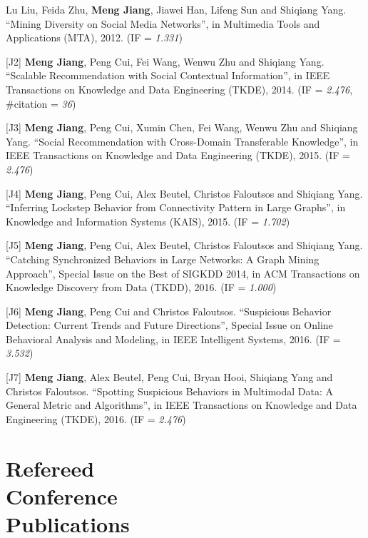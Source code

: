 \documentclass[margin, 10pt]{res}
\begin{document}
\begin{resume}
[J1] Lu Liu, Feida Zhu, \textbf{Meng Jiang}, Jiawei Han, Lifeng Sun and Shiqiang Yang. ``Mining Diversity on Social Media Networks'', in Multimedia Tools and Applications (MTA), 2012. (IF = \textit{1.331})

[J2] \textbf{Meng Jiang}, Peng Cui, Fei Wang, Wenwu Zhu and Shiqiang Yang. ``Scalable Recommendation with Social Contextual Information'', in IEEE Transactions on Knowledge and Data Engineering (TKDE), 2014. (IF = \textit{2.476}, \#citation = \textit{36})

[J3] \textbf{Meng Jiang}, Peng Cui, Xumin Chen, Fei Wang, Wenwu Zhu and Shiqiang Yang. ``Social Recommendation with Cross-Domain Transferable Knowledge'', in IEEE Transactions on Knowledge and Data Engineering (TKDE), 2015. (IF = \textit{2.476})

[J4] \textbf{Meng Jiang}, Peng Cui, Alex Beutel, Christos Faloutsos and Shiqiang Yang. ``Inferring Lockstep Behavior from Connectivity Pattern in Large Graphs'', in Knowledge and Information Systems (KAIS), 2015. (IF = \textit{1.702})

[J5] \textbf{Meng Jiang}, Peng Cui, Alex Beutel, Christos Faloutsos and Shiqiang Yang. ``Catching Synchronized Behaviors in Large Networks: A Graph Mining Approach'', Special Issue on the Best of SIGKDD 2014, in ACM Transactions on Knowledge Discovery from Data (TKDD), 2016. (IF = \textit{1.000})

[J6] \textbf{Meng Jiang}, Peng Cui and Christos Faloutsos. ``Suspicious Behavior Detection: Current Trends and Future Directions'', Special Issue on Online Behavioral Analysis and Modeling, in IEEE Intelligent Systems, 2016. (IF = \textit{3.532})

[J7] \textbf{Meng Jiang}, Alex Beutel, Peng Cui, Bryan Hooi, Shiqiang Yang and Christos Faloutsos. ``Spotting Suspicious Behaviors in Multimodal Data: A General Metric and Algorithms'', in IEEE Transactions on Knowledge and Data Engineering (TKDE), 2016. (IF = \textit{2.476})


\section{Refereed \\ Conference \\ Publications}


\end{resume}
\end{document}
